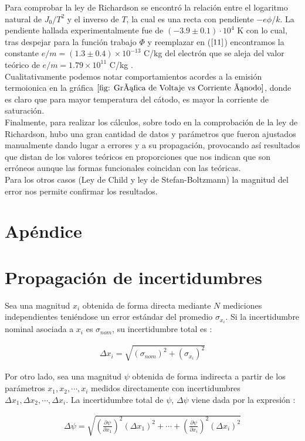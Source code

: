 \documentclass[%
 reprint,
 amsmath,amssymb,
 aps,
]{revtex4-2}
\begin{document}
Para comprobar la ley de Richardson se encontró la relación entre el logaritmo natural de $J_0/T^2$ y el inverso de $T$, la cual es una recta con pendiente $-e\phi$/$k$. La pendiente hallada experimentalmente fue de $(-3.9 \pm 0.1) \cdot 10^4 \text{ K}$ con lo cual, tras despejar para la función trabajo $\Phi$ y reemplazar en ($\ref{11}$) encontramos la constante $e/m = (1.3 \pm 0.4) \times 10^{-13}$ C/kg del electrón que se aleja del valor teórico de $e/m = 1.79 \times 10^{11}$ C/kg \cite{codata}.
\\

Cualitativamente podemos notar comportamientos acordes a la emisión termoionica en la gráfica $\ref{fig: Gráfica de Voltaje vs Corriente ánodo}$, donde es claro que para mayor temperatura del cátodo, es mayor la corriente de saturación.
\\

Finalmente, para realizar los cálculos, sobre todo en la comprobación de la ley de Richardson, hubo una gran cantidad de datos y parámetros que fueron ajustados manualmente dando lugar a errores y a su propagación, provocando así resultados que distan de los valores teóricos en proporciones que nos indican que son erróneos aunque las formas funcionales coincidan con las teóricas.\\

Para los otros casos (Ley de Child y ley de Stefan-Boltzmann) la magnitud del error nos permite confirmar los resultados.



\section{Apéndice}

\appendix
\section{Propagación de incertidumbres}
Sea una magnitud $x_i$ obtenida de forma directa mediante $N$ mediciones independientes teniéndose un error estándar del promedio $\sigma_{x_i}$. Si la incertidumbre nominal asociada a $x_i$ es $\sigma_{nom}$, su incertidumbre total es \cite{ardila}:

\begin{align*}
    \Delta x_i = \sqrt{(\sigma_{nom})^2+ (\sigma_{x_i})^2}
\end{align*}

\vspace{0.2 cm}
Por otro lado, sea una magnitud $\psi$ obtenida de forma indirecta a partir de los parámetros $x_{1}, x_{2}, \dotsb, x_{i}$ medidos directamente con incertidumbres $\Delta x_{1}, \Delta x_{2}, \dotsb, \Delta x_{i}$. La incertidumbre total de $\psi$, $\Delta \psi$ viene dada por la expresión \cite{ardila}:

\begin{align}
    \Delta \psi = \sqrt{\left( \frac{\partial \psi}{\partial x_{1}}\right)^2(\Delta x_{1})^2  + \dotsb + \left( \frac{\partial \psi}{\partial x_{i}}\right)^2(\Delta x_{i})^2}
    \label{Itmbre_Varias_Medidas}
\end{align}
\end{document}
